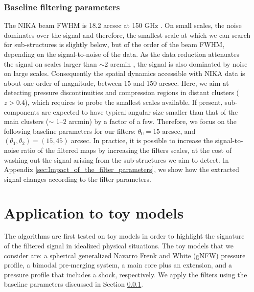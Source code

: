 \documentclass[twocolumn,traditabstract]{aa}
\begin{document}
\subsubsection{Baseline filtering parameters}\label{sec:Baseline_filtering_parameters}
The NIKA beam FWHM is 18.2 arcsec at 150 GHz \citep{Catalano2014}. On small scales, the noise dominates over the signal and therefore, the smallest scale at which we can search for sub-structures is slightly below, but of the order of the beam FWHM, depending on the signal-to-noise of the data. As the data reduction attenuates the signal on scales larger than $\sim 2$ arcmin \citep[see][and Section \ref{sec:Systematics_and_noise_properties}]{Adam2015}, the signal is also dominated by noise on large scales. Consequently the spatial dynamics accessible with NIKA data is about one order of magnitude, between 15 and 150 arcsec. Here, we aim at detecting pressure discontinuities and compression regions in distant clusters ($z>0.4$), which requires to probe the smallest scales available. If present, sub-components are expected to have typical angular size smaller than that of the main clusters ($\sim$ 1--2 arcmin) by a factor of a few. Therefore, we focus on the following baseline parameters for our filters: $\theta_0 = 15$ arcsec, and $\left(\theta_1, \theta_2\right) = \left(15, 45\right)$ arcsec. In practice, it is possible to increase the signal-to-noise ratio of the filtered maps by increasing the filters scales, at the cost of washing out the signal arising from the sub-structures we aim to detect. In Appendix \ref{sec:Impact_of_the_filter_parameters}, we show how the extracted signal changes according to the filter parameters.

\section{Application to toy models}\label{sec:Application_to_toy_models}
The algorithms are first tested on toy models in order to highlight the signature of the filtered signal in idealized physical situations. The toy models that we consider are: a spherical generalized Navarro Frenk and White (gNFW) pressure profile, a bimodal pre-merging system, a main core plus an extension, and a pressure profile that includes a shock, respectively. We apply the filters using the baseline parameters discussed in Section \ref{sec:Baseline_filtering_parameters}.
\end{document}

